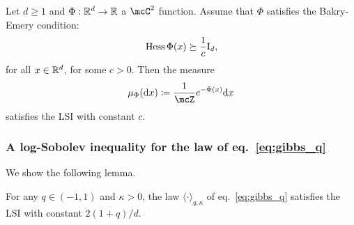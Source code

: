 \begin{theorem}\label{thm:be_implies_lsi}
    Let $d \geq 1$ and $\Phi : \mathbb{R}^d \to \mathbb{R}$ a $\mcC^2$ function. 
    Assume that $\Phi$ satisfies the Bakry-Emery condition:
    \begin{equation*}
         {\rm Hess} \, \Phi (x) \succeq \frac{1}{c} \mathrm{I}_d,
    \end{equation*}
    for all $x \in \mathbb{R}^d$, for some $c > 0$. 
    Then the measure
    \begin{equation*}
        \mu_\Phi(\rd x) \coloneqq \frac{1}{\mcZ} e^{-\Phi(x)} \rd x
    \end{equation*}
    satisfies the LSI with constant $c$.
\end{theorem}

\subsubsection{\texorpdfstring{A log-Sobolev inequality for the law of eq.~\eqref{eq:gibbs_q}}{}}\label{subsubsec:lsi_Pqkappa}

We show the following lemma.
\begin{lemma}\label{lemma:lsi_Pqkappa}
   For any $q \in (-1,1)$ and $\kappa > 0$,
   the law $\langle \cdot \rangle_{q,\kappa}$ of eq.~\eqref{eq:gibbs_q} satisfies the LSI with constant $2(1+q)/d$.
\end{lemma}

